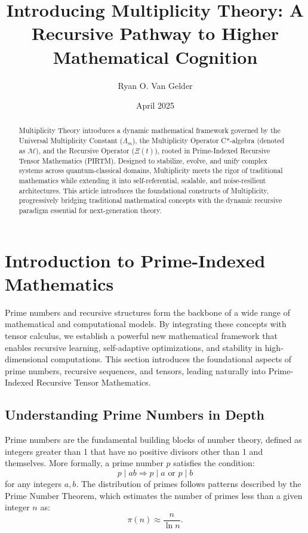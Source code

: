 \documentclass[12pt]{article}
\title{Introducing Multiplicity Theory: A Recursive Pathway to Higher Mathematical Cognition}
\author{Ryan O. Van Gelder}
\date{April 2025}
\begin{document}
\maketitle

\begin{abstract}
Multiplicity Theory introduces a dynamic mathematical framework governed by the Universal Multiplicity Constant (\( \Lambda_m \)), the Multiplicity Operator C*-algebra (denoted as \( \mathcal{M} \)), and the Recursive Operator (\( \Xi(t) \)), rooted in Prime-Indexed Recursive Tensor Mathematics (PIRTM). Designed to stabilize, evolve, and unify complex systems across quantum-classical domains, Multiplicity meets the rigor of traditional mathematics while extending it into self-referential, scalable, and noise-resilient architectures. This article introduces the foundational constructs of Multiplicity, progressively bridging traditional mathematical concepts with the dynamic recursive paradigm essential for next-generation theory.
\end{abstract}

\section{Introduction to Prime-Indexed Mathematics}

Prime numbers and recursive structures form the backbone of a wide range of mathematical and computational models. By integrating these concepts with tensor calculus, we establish a powerful new mathematical framework that enables recursive learning, self-adaptive optimizations, and stability in high-dimensional computations. This section introduces the foundational aspects of prime numbers, recursive sequences, and tensors, leading naturally into Prime-Indexed Recursive Tensor Mathematics.

\subsection{Understanding Prime Numbers in Depth}

Prime numbers are the fundamental building blocks of number theory, defined as integers greater than 1 that have no positive divisors other than 1 and themselves. More formally, a prime number \( p \) satisfies the condition:
\[
p \mid ab \Rightarrow p \mid a \text{ or } p \mid b
\]
for any integers \( a, b \). The distribution of primes follows patterns described by the Prime Number Theorem, which estimates the number of primes less than a given integer \( n \) as:
\[
\pi(n) \approx \frac{n}{\ln n}.
\]
\end{document}
